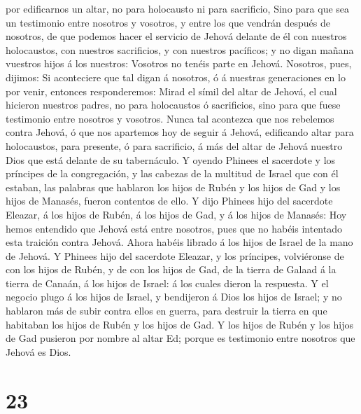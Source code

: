 por edificarnos un altar, no para holocausto ni para sacrificio,
 Sino para que sea un testimonio entre nosotros y vosotros,
y entre los que vendrán después de nosotros, de que podemos hacer el
servicio de Jehová delante de él con nuestros holocaustos, con nuestros
sacrificios, y con nuestros pacíficos; y no digan mañana vuestros hijos
á los nuestros: Vosotros no tenéis parte en Jehová. 
Nosotros, pues, dijimos: Si aconteciere que tal digan á nosotros, ó á
nuestras generaciones en lo por venir, entonces responderemos: Mirad el
símil del altar de Jehová, el cual hicieron nuestros padres, no para
holocaustos ó sacrificios, sino para que fuese testimonio entre nosotros
y vosotros.  Nunca tal acontezca que nos rebelemos contra
Jehová, ó que nos apartemos hoy de seguir á Jehová, edificando altar
para holocaustos, para presente, ó para sacrificio, á más del altar de
Jehová nuestro Dios que está delante de su tabernáculo.  Y
oyendo Phinees el sacerdote y los príncipes de la congregación, y las
cabezas de la multitud de Israel que con él estaban, las palabras que
hablaron los hijos de Rubén y los hijos de Gad y los hijos de Manasés,
fueron contentos de ello.  Y dijo Phinees hijo del
sacerdote Eleazar, á los hijos de Rubén, á los hijos de Gad, y á los
hijos de Manasés: Hoy hemos entendido que Jehová está entre nosotros,
pues que no habéis intentado esta traición contra Jehová. Ahora habéis
librado á los hijos de Israel de la mano de Jehová.  Y
Phinees hijo del sacerdote Eleazar, y los príncipes, volviéronse de con
los hijos de Rubén, y de con los hijos de Gad, de la tierra de Galaad á
la tierra de Canaán, á los hijos de Israel: á los cuales dieron la
respuesta.  Y el negocio plugo á los hijos de Israel, y
bendijeron á Dios los hijos de Israel; y no hablaron más de subir contra
ellos en guerra, para destruir la tierra en que habitaban los hijos de
Rubén y los hijos de Gad.  Y los hijos de Rubén y los hijos
de Gad pusieron por nombre al altar Ed; porque es testimonio entre
nosotros que Jehová es Dios.

\hypertarget{section-22}{%
\section{23}\label{section-22}}

